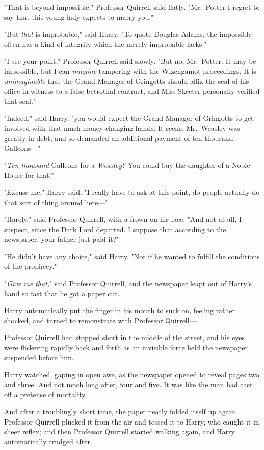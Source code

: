 "That is beyond impossible," Professor Quirrell said flatly.
"Mr.~Potter{\el} I regret to say that this young lady expects to marry you."

"But \emph{that} is improbable," said Harry. "To quote Douglas Adams, the
impossible often has a kind of integrity which the merely improbable lacks."

"I see your point," Professor Quirrell said slowly. "But{\el} no,
Mr.~Potter. It may be impossible, but I can \emph{imagine} tampering with the
Wizengamot proceedings. It is \emph{unimaginable} that the Grand Manager of
Gringotts should affix the seal of his office in witness to a false betrothal
contract, and Miss Skeeter personally verified that seal."

"Indeed," said Harry, "you would expect the Grand Manager of Gringotts to get
involved with that much money changing hands. It seems Mr.~Weasley was greatly
in debt, and so demanded an additional payment of ten thousand Galleons\mbox{---}"

"\emph{Ten thousand} Galleons for a \emph{Weasley?} You could buy the daughter
of a Noble House for that!"

"Excuse me," Harry said. "I really have to ask at this point, do people
actually do that sort of thing around here\mbox{---}"

"Rarely," said Professor Quirrell, with a frown on his face. "And not at all, I
suspect, since the Dark Lord departed. I suppose that according to the
newspaper, your father just paid it?"

"He didn't have any choice," said Harry. "Not if he wanted to fulfill the
conditions of the prophecy."

"\emph{Give me that,}" said Professor Quirrell, and the newspaper leapt out of
Harry's hand so fast that he got a paper cut.

Harry automatically put the finger in his mouth to suck on, feeling rather
shocked, and turned to remonstrate with Professor Quirrell\mbox{---}

Professor Quirrell had stopped short in the middle of the street, and his eyes
were flickering rapidly back and forth as an invisible force held the newspaper
suspended before him.

Harry watched, gaping in open awe, as the newspaper opened to reveal pages two
and three. And not much long after, four and five. It was like the man had cast
off a pretense of mortality.

And after a troublingly short time, the paper neatly folded itself up again.
Professor Quirrell plucked it from the air and tossed it to Harry, who caught
it in sheer reflex; and then Professor Quirrell started walking again, and
Harry automatically trudged after.


